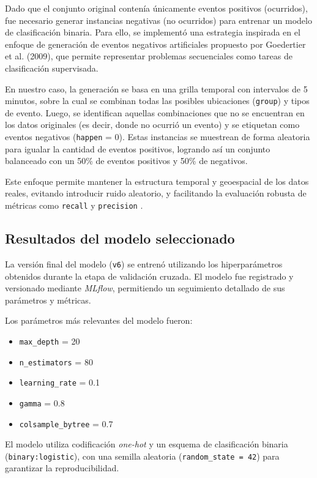 \documentclass[12pt]{article}
\begin{document}
Dado que el conjunto original contenía únicamente eventos positivos (ocurridos), fue necesario generar instancias negativas (no ocurridos) para entrenar un modelo de clasificación binaria. Para ello, se implementó una estrategia inspirada en el enfoque de generación de eventos negativos artificiales propuesto por Goedertier et al. (2009), que permite representar problemas secuenciales como tareas de clasificación supervisada.

En nuestro caso, la generación se basa en una grilla temporal con intervalos de 5 minutos, sobre la cual se combinan todas las posibles ubicaciones (\texttt{group}) y tipos de evento. Luego, se identifican aquellas combinaciones que no se encuentran en los datos originales (es decir, donde no ocurrió un evento) y se etiquetan como eventos negativos (\texttt{happen} = 0). Estas instancias se muestrean de forma aleatoria para igualar la cantidad de eventos positivos, logrando así un conjunto balanceado con un 50\% de eventos positivos y 50\% de negativos.

Este enfoque permite mantener la estructura temporal y geoespacial de los datos reales, evitando introducir ruido aleatorio, y facilitando la evaluación robusta de métricas como \texttt{recall} y \texttt{precision} \parencite{goedertier2009robust}.


\subsection{Resultados del modelo seleccionado}

La versión final del modelo (\texttt{v6}) se entrenó utilizando los hiperparámetros obtenidos durante la etapa de validación cruzada. El modelo fue registrado y versionado mediante \textit{MLflow}, permitiendo un seguimiento detallado de sus parámetros y métricas.

\noindent Los parámetros más relevantes del modelo fueron:

\begin{itemize}
    \item \texttt{max\_depth} = 20
    \item \texttt{n\_estimators} = 80
    \item \texttt{learning\_rate} = 0.1
    \item \texttt{gamma} = 0.8
    \item \texttt{colsample\_bytree} = 0.7
\end{itemize}

El modelo utiliza codificación \textit{one-hot} y un esquema de clasificación binaria (\texttt{binary:logistic}), con una semilla aleatoria (\texttt{random\_state = 42}) para garantizar la reproducibilidad.
\end{document}
